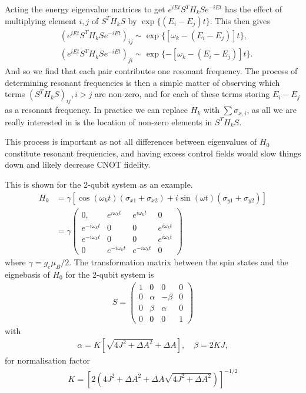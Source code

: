 \documentclass[../Thesis.tex]{subfiles}
\begin{document}
Acting the energy eigenvalue matrices to get $e^{iEt}S^T H_k S e^{-iEt}$ has the effect of multiplying element $i,j$ of $S^T H_k S $ by $\exp\{(E_i-E_j)t\}$. This then gives
\begin{align}
    &(e^{iEt}S^T H_{k} S e^{-iEt})_{ij}\sim \exp\{[\omega_k - (E_i-E_j)]t\},\\
    &(e^{iEt}S^T H_{k} S e^{-iEt})_{ji}\sim \exp\{-[\omega_k-(E_i-E_j)]t\}.
\end{align}
And so we find that each pair contributes one resonant frequency. The process of determining resonant frequencies is then a simple matter of observing which terms $(S^TH_{k}S)_{ij},i>j$ are non-zero, and for each of these terms storing $E_i-E_j$ as a resonant frequency. In practice we can replace $H_{k}$ with $\sum\sigma_{x,i}$, as all we are really interested in is the location of non-zero elements in $S^TH_kS$.

This process is important as not all differences between eigenvalues of $H_0$ constitute resonant frequencies, and having excess control fields would slow things down and likely decrease CNOT fidelity.





This is shown for the 2-qubit system as an example.
\begin{align}
    H_k&= \gamma\left[\cos(\omega_kt)(\sigma_{x1}+\sigma_{x2})+i\sin(\omega t)(\sigma_{y1}+\sigma_{y2})\right]\\
    & = 
    \gamma\begin{pmatrix}
    0, &e^{i\omega_kt} &e^{i\omega_k t} &0\\
    e^{-i\omega_k t} &0 &0 &e^{i\omega_k t}\\
    e^{-i\omega_k t} &0 &0 &e^{i\omega_k t}\\
    0 &e^{-i\omega_k t} &e^{-i\omega_k t} &0
    \end{pmatrix}
\end{align}
where $\gamma = g_e\mu_B/2$.
The transformation matrix between the spin states and the eignebasis of $H_0$ for the 2-qubit system is 
\begin{align}
    S = \begin{pmatrix} 
    1 &0 &0 &0\\
    0 &\alpha &-\beta &0\\
    0 &\beta &\alpha &0\\
    0&0 &0 &1
    \end{pmatrix}
\end{align}
with
\begin{align}
    \alpha = K\left[\sqrt{4J^2 + \Delta A^2} + \Delta A\right] , \quad \beta = 2KJ,
\end{align}
for normalisation factor 
\begin{align}
    K = \left[2\left(4J^2 + \Delta A^2 + \Delta A\sqrt{4J^2+\Delta A^2}\right)\right]^{-1/2}
\end{align}
\end{document}
